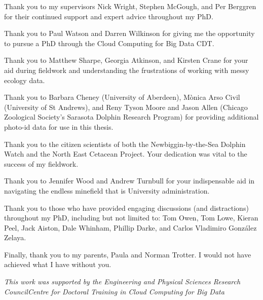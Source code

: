 
\begin{acknowledgements}

\noindent Thank you to my supervisors Nick Wright, Stephen McGough, and Per Berggren for their continued support and expert advice throughout my PhD. \newline

\noindent Thank you to Paul Watson and Darren Wilkinson for giving me the opportunity to pursue a PhD through the Cloud Computing for Big Data CDT. \newline

\noindent Thank you to Matthew Sharpe, Georgia Atkinson, and Kirsten Crane for your aid during fieldwork and understanding the frustrations of working with messy ecology data.\newline

\noindent Thank you to Barbara Cheney (University of Aberdeen), M\`{o}nica Arso Civil (University of St Andrews), and Reny Tyson Moore and Jason Allen (Chicago Zoological Society's Sarasota Dolphin Research Program) for providing additional photo-id data for use in this thesis.\newline

\noindent Thank you to the citizen scientists of both the Newbiggin-by-the-Sea Dolphin Watch and the North East Cetacean Project. Your dedication was vital to the success of my fieldwork. \newline

\noindent Thank you to Jennifer Wood and Andrew Turnbull for your indispensable aid in navigating the endless minefield that is University administration.\newline

\noindent Thank you to those who have provided engaging discussions (and distractions) throughout my PhD, including but not limited to: Tom Owen, Tom Lowe, Kieran Peel, Jack Aiston, Dale Whinham, Phillip Darke, and Carlos Vladimiro González Zelaya. \newline

\noindent Finally, thank you to my parents, Paula and Norman Trotter. I would not have achieved what I have without you.\newline

\noindent \centering\textit{This work was supported by the Engineering and Physical Sciences Research Council\newline Centre for Doctoral Training in Cloud Computing for Big Data\newline[EP/L015358/1]} 

\end{acknowledgements}
